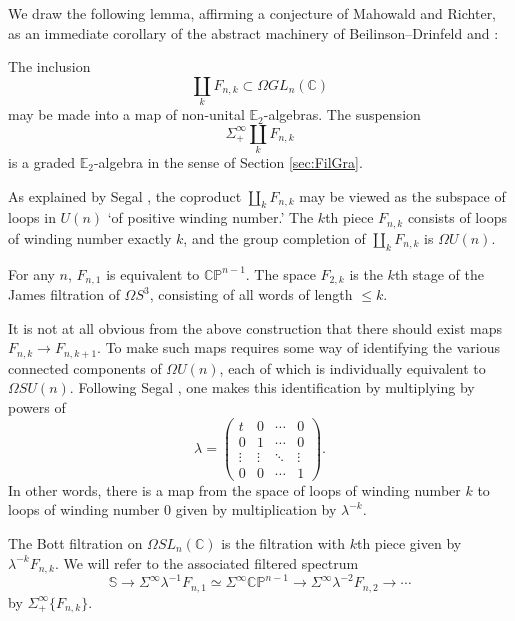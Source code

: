 We draw the following lemma, affirming a conjecture of Mahowald and Richter, as an immediate corollary of the abstract machinery of Beilinson--Drinfeld \cite[3.1.14]{Zhu} and \cite[5.5.4.10]{HA}:

\begin{lem}  
The inclusion 
$$\coprod_k F_{n,k} \subset \Omega GL_n(\mathbb{C})$$
may be made into a map of non-unital $\mathbb{E}_2$-algebras.  The suspension $$\Sigma^{\infty}_+ \coprod_k F_{n,k}$$ is a graded $\mathbb{E}_2$-algebra in the sense of Section \ref{sec:FilGra}.
\end{lem}

As explained by Segal \cite{Segal}, the coproduct $\coprod_k F_{n,k}$ may be viewed as the subspace of loops in $U(n)$ `of positive winding number.'  The $k$th piece $F_{n,k}$ consists of loops of winding number exactly $k$, and the group completion of $\coprod_k F_{n,k}$ is $\Omega U(n)$.

\begin{exm}
For any $n$, $F_{n,1}$ is equivalent to $\mathbb{CP}^{n-1}$.  The space $F_{2,k}$ is the $k$th stage of the James filtration of $\Omega S^3$, consisting of all words of length $\le k$.
\end{exm}

It is not at all obvious from the above construction that there should exist maps $F_{n,k} \rightarrow F_{n,k+1}$.  To make such maps requires some way of identifying the various connected components of $\Omega U(n)$, each of which is individually equivalent to $\Omega SU(n)$.  Following Segal \cite[pg. 3--4]{Segal}, one makes this identification by multiplying by powers of 
$$\lambda = \left( \begin{array}{cccc} t & 0 & \cdots & 0 \\ 0 & 1 & \cdots & 0 \\ \vdots & \vdots & \ddots & \vdots \\ 0 & 0 & \cdots & 1 \end{array} \right).$$
In other words, there is a map from the space of loops of winding number $k$ to loops of winding number $0$ given by multiplication by $\lambda^{-k}$.

\begin{dfn}
The Bott filtration on $\Omega SL_n(\mathbb{C})$ is the filtration with $k$th piece given by $\lambda^{-k} F_{n,k}$.  We will refer to the associated filtered spectrum 
$$\mathbb{S} \rightarrow \Sigma^{\infty} \lambda^{-1} F_{n,1} \simeq \Sigma^{\infty} \mathbb{CP}^{n-1} \rightarrow \Sigma^{\infty} \lambda^{-2} F_{n,2} \rightarrow \cdots$$
by $\Sigma^{\infty}_+ \{F_{n,k}\}$.
\end{dfn}

